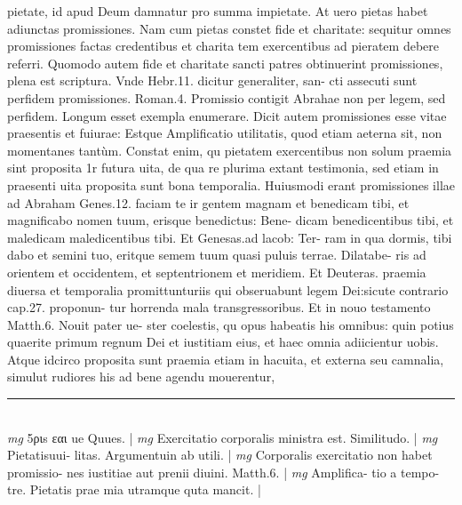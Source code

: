 \documentclass{article}
\begin{document}
\begin{pages}
pietate, id apud Deum damnatur pro summa impietate. At uero pietas habet adiunctas promissiones. Nam cum pietas constet fide et charitate: sequitur omnes promissiones factas credentibus et charita tem exercentibus ad pieratem debere referri. Quomodo autem fide et charitate sancti patres obtinuerint promissiones, plena est scriptura. Vnde Hebr.11. dicitur generaliter, san- cti assecuti sunt perfidem promissiones. Roman.4. Promissio contigit Abrahae non per legem, sed perfidem. Longum esset exempla enumerare. Dicit autem promissiones esse vitae praesentis et fuiurae: Estque Amplificatio utilitatis, quod etiam aeterna sit, non momentanes tantùm. Constat enim, qu pietatem exercentibus non solum praemia sint proposita 1r futura uita, de qua re plurima extant testimonia, sed etiam in praesenti uita proposita sunt bona temporalia. Huiusmodi erant promissiones illae ad Abraham Genes.12. faciam te ir gentem magnam et benedicam tibi, et magnificabo nomen tuum, erisque benedictus: Bene- dicam benedicentibus tibi, et maledicam maledicentibus tibi. Et Genesas.ad lacob: Ter- ram in qua dormis, tibi dabo et semini tuo, eritque semem tuum quasi puluis terrae. Dilatabe-  ris ad orientem et occidentem, et septentrionem et meridiem. Et Deuteras. praemia diuersa et temporalia promittunturiis qui obseruabunt legem Dei:sicute contrario cap.27. proponun- tur horrenda mala transgressoribus. Et in nouo testamento Matth.6. Nouit pater ue- ster coelestis, qu opus habeatis his omnibus: quin potius quaerite primum regnum Dei et iustitiam eius, et haec omnia adiicientur uobis. Atque idcirco proposita sunt praemia etiam in hacuita, et externa seu camnalia, simulut rudiores his ad bene agendu mouerentur,  \pend
\vspace{0.5cm}\noindent
\vspace{0.2cm}\rule{1cm}{0.2pt}\\ 
\hspace{0.2cm}\textit{mg}
\footnotesize 5ριs εαι ue Quues. 
\normalsize| 
\hspace{0.2cm}\textit{mg}
\footnotesize Exercitatio corporalis ministra est. Similitudo. 
\normalsize| 
\hspace{0.2cm}\textit{mg}
\footnotesize Pietatisuui- litas. Argumentuin ab utili. 
\normalsize| 
\hspace{0.2cm}\textit{mg}
\footnotesize Corporalis exercitatio non habet promissio- nes iustitiae aut prenii diuini. Matth.6. 
\normalsize| 
\hspace{0.2cm}\textit{mg}
\footnotesize Amplifica- tio a tempo- tre. Pietatis prae mia utramque  quta mancit. 
\normalsize| 

\end{pages}
\end{document}
